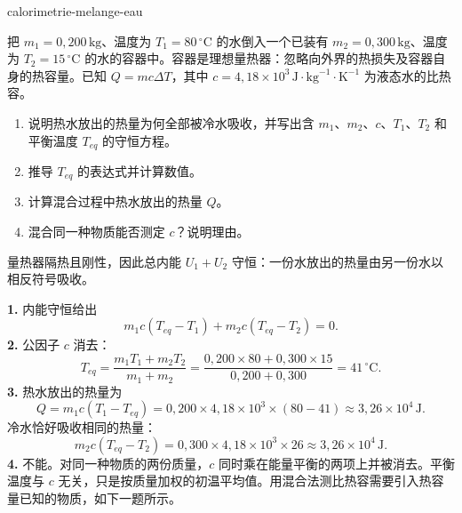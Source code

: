 \begin{exo}[混合两份水]{calorimetrie-melange-eau}

把 $m_1=0{,}200\,\text{kg}$、温度为 $T_1=80\,^\circ\text{C}$ 的水倒入一个已装有 $m_2=0{,}300\,\text{kg}$、温度为 $T_2=15\,^\circ\text{C}$ 的水的容器中。容器是理想量热器：忽略向外界的热损失及容器自身的热容量。已知 $Q=mc\Delta T$，其中 $c=4{,}18\times10^3\,\text{J}\!\cdot\!\text{kg}^{-1}\!\cdot\!\text{K}^{-1}$ 为液态水的比热容。
\begin{enumerate}
  \item 说明热水放出的热量为何全部被冷水吸收，并写出含 $m_1$、$m_2$、$c$、$T_1$、$T_2$ 和平衡温度 $T_{eq}$ 的守恒方程。
  \item 推导 $T_{eq}$ 的表达式并计算数值。
  \item 计算混合过程中热水放出的热量 $Q$。
  \item 混合同一种物质能否测定 $c$？说明理由。
\end{enumerate}
\begin{indication}
量热器隔热且刚性，因此总内能 $U_1+U_2$ 守恒：一份水放出的热量由另一份水以相反符号吸收。
\end{indication}
\begin{solution}
\textbf{1.} 内能守恒给出
\[
m_1c(T_{eq}-T_1)+m_2c(T_{eq}-T_2)=0.
\]
\textbf{2.} 公因子 $c$ 消去：
\[
T_{eq}=\frac{m_1T_1+m_2T_2}{m_1+m_2}
=\frac{0{,}200\times80+0{,}300\times15}{0{,}200+0{,}300}=41\,^\circ\text{C}.
\]
\textbf{3.} 热水放出的热量为
\[
Q=m_1c(T_1-T_{eq})=0{,}200\times4{,}18\times10^3\times(80-41)
\approx3{,}26\times10^4\,\text{J}.
\]
冷水恰好吸收相同的热量：
\[
m_2c(T_{eq}-T_2)=0{,}300\times4{,}18\times10^3\times26
\approx3{,}26\times10^4\,\text{J}.
\]
\textbf{4.} 不能。对同一种物质的两份质量，$c$ 同时乘在能量平衡的两项上并被消去。平衡温度与 $c$ 无关，只是按质量加权的初温平均值。用混合法测比热容需要引入热容量已知的物质，如下一题所示。
\end{solution}
\end{exo}

